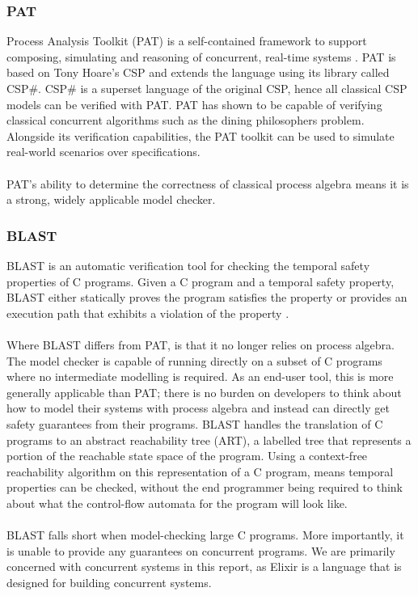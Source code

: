 \subsubsection*{\textbf{PAT}}
Process Analysis Toolkit (PAT) is a self-contained framework to support composing, simulating and reasoning of concurrent, real-time systems \cite{pat}. PAT is based on Tony Hoare's CSP and extends the language using its library called CSP\#. CSP\# is a superset language of the original CSP, hence all classical CSP models can be verified with PAT. PAT has shown to be capable of verifying classical concurrent algorithms such as the dining philosophers problem. Alongside its verification capabilities, the PAT toolkit can be used to simulate real-world scenarios over specifications. 
\\ \\
PAT's ability to determine the correctness of classical process algebra means it is a strong, widely applicable model checker.

\subsubsection*{\textbf{BLAST}}
BLAST is an automatic verification tool for checking the temporal safety properties of C programs. Given a C program and a temporal safety property, BLAST either statically proves the program satisfies the property or provides an execution path that exhibits a violation of the property \cite{blast}.
\\ \\
Where BLAST differs from PAT, is that it no longer relies on process algebra. The model checker is capable of running directly on a subset of C programs where no intermediate modelling is required. As an end-user tool, this is more generally applicable than PAT; there is no burden on developers to think about how to model their systems with process algebra and instead can directly get safety guarantees from their programs. BLAST handles the translation of C programs to an abstract reachability tree (ART), a labelled tree that represents a portion of the reachable state space of the program. Using a context-free reachability algorithm on this representation of a C program, means temporal properties can be checked, without the end programmer being required to think about what the control-flow automata for the program will look like.
\\ \\
BLAST falls short when model-checking large C programs. More importantly, it is unable to provide any guarantees on concurrent programs. We are primarily concerned with concurrent systems in this report, as Elixir is a language that is designed for building concurrent systems.

